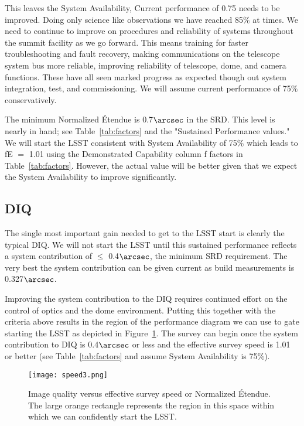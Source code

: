 This leaves the System Availability, Current performance of 0.75 needs to be improved. Doing only science like observations we have reached 85$\%$ at times. We need to continue to improve on procedures and reliability of systems throughout the summit facility as we go forward. This means training for faster troubleshooting and fault recovery, making communications on the telescope system bus more reliable, improving reliability of telescope, dome, and camera functions. These have all seen marked progress as expected though out system integration, test, and commissioning. We will assume current performance of 75$\%$ conservatively. 

The minimum Normalized \'{E}tendue is 0.7$\arcsec$ in the SRD. This level is nearly in hand; see Table~\ref{tab:factors} and the "Sustained Performance values." We will start the LSST consistent with System Availability of 75$\%$ which leads to fE $=$ 1.01 using the Demonstrated Capability column f factors in Table~\ref{tab:factors}. However, the actual value will be better given that we expect the System Availability to improve significantly. 

\subsection{DIQ}

The single most important gain needed to get to the LSST start is clearly the typical DIQ. We will not start the LSST until this sustained performance reflects a system contribution of $\le$ 0.4$\arcsec$, the minimum SRD requirement. The very best the system contribution can be given current as build measurements is 0.327$\arcsec$. 

Improving the system contribution to the DIQ requires continued effort on the control of optics and the dome environment. Putting this together with the criteria above results in the region of the performance diagram we can use to gate starting the LSST as depicted in Figure~\ref{speed3}. The survey can begin once the system contribution to DIQ is 0.4$\arcsec$ or less and the effective survey speed is 1.01 or better (see Table~\ref{tab:factors} and assume System Availability is 75$\%$).

\begin{figure}[t]
  \centering
\texttt{[image: speed3.png]}
\caption{Image quality versus effective survey speed or Normalized \'{E}tendue. The large orange rectangle represents the region in this space within which we can confidently start the LSST.}
\label{speed3}
\end{figure}

\newpage
